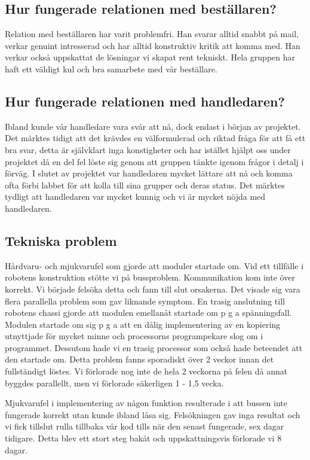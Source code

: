\documentclass[a4paper,12pt,fleqn]{article}
\begin{document}
\subsection{Hur fungerade relationen med beställaren?}
Relation med beställaren har varit problemfri. Han svarar alltid snabbt på mail, verkar genuint intresserad och har alltid konstruktiv kritik att komma med. Han verkar också uppskattat de lösningar vi skapat rent tekniskt. Hela gruppen har haft ett väldigt kul och bra samarbete med vår beställare. 

\subsection{Hur fungerade relationen med handledaren?}
Ibland kunde vår handledare vara svår att nå, dock endast i början av projektet. Det märktes tidigt att det krävdes en välformulerad och riktad fråga för att få ett bra svar, detta är självklart inga konstigheter och har istället hjälpt oss under projektet då en del fel löste sig genom att gruppen tänkte igenom frågor i detalj i förväg. I slutet av projektet var handledaren mycket lättare att nå och komma ofta förbi labbet för att kolla till sina grupper och deras status. Det märktes tydligt att handledaren var mycket kunnig och vi är mycket nöjda med handledaren.

\subsection{Tekniska problem}

Hårdvaru- och mjukvarufel som gjorde att moduler startade om. 
Vid ett tillfälle i robotens konstruktion stötte vi på bussproblem. Kommunikation kom inte över korrekt. Vi började felsöka detta och fann till slut orsakerna. Det visade sig vara flera parallella problem som gav liknande symptom. En trasig anslutning till robotens chassi gjorde att modulen emellanåt startade om p g a spänningsfall. Modulen startade om sig p g a att en dålig implementering av en kopiering utnyttjade för mycket minne och processorns programpekare slog om i programmet. Dessutom hade vi en trasig processor som också hade beteendet att den startade om. Detta problem fanns sporadiskt över 2 veckor innan det fullständigt löstes. Vi förlorade nog inte de hela 2 veckorna på felen då annat byggdes parallellt, men vi förlorade säkerligen 1 - 1,5 vecka.

Mjukvarufel i implementering av någon funktion resulterade i att bussen inte fungerade korrekt utan kunde ibland låsa sig.
Felsökningen gav inga resultat och vi fick tillslut rulla tillbaka vår kod tills när den senast fungerade, sex dagar tidigare. Detta blev ett stort steg bakåt och uppskattningsvis förlorade vi 8 dagar.
\end{document}
